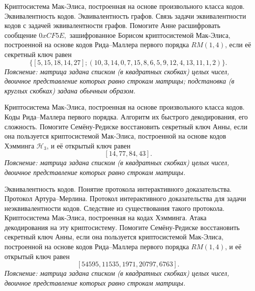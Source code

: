 \begin{questions}
    \question
        Криптосистема Мак-Элиса, построенная на основе произвольного класса кодов.
    \question
        Эквивалентность кодов.
        Эквивалентность графов.
        Связь задачи эквивалентности кодов с задачей эквивалентности графов.
    \question
        Помогите Анне расшифровать сообщение \(0xCF5E,\) зашифрованное Борисом криптосистемой Мак-Элиса, построенной на основе кодов Рида--Маллера первого порядка \(RM(1,4)\), если её секретный ключ равен \[\{[5, 15, 18, 14, 27]; (10, 3, 14, 0, 7, 15, 8, 6, 5, 9, 12, 4, 13, 11, 1, 2)\}.\]
        \emph{Пояснение: матрица задана списком (в квадратных скобках) целых чисел, двоичное представление которых равно строкам матрицы; подстановка (в круглых скобках) задана обычным образом.}
\end{questions}


\begin{questions}
    \question
        Криптосистема Мак-Элиса, построенная на основе произвольного класса кодов.
    \question
        Коды Рида--Маллера первого порядка.
        Алгоритм их быстрого декодирования, его сложность.
    \question
        Помогите Семёну-Редиске восстановить секретный ключ Анны, если она пользуется криптосистемой Мак-Элиса, построенной на основе кодов Хэмминга \(\mathcal{H}_3\), и её открытый ключ равен 
        \[[14, 77, 84, 43].\]
        \emph{Пояснение: матрица задана списком (в квадратных скобках) целых чисел, двоичное представление которых равно строкам матрицы.}
\end{questions}


\begin{questions}
    \question
        Эквивалентность кодов.
        Понятие протокола интерактивного доказательства.
        Протокол Артура--Мерлина.
        Протокол интерактивного доказательства для задачи неэквивалентности кодов.
        Следствие из существования такого протокола.
    \question
        Криптосистема Мак-Элиса, построенная на кодах Хэмминга.
        Атака декодирования на эту криптосистему.
    \question
        Помогите Семёну-Редиске восстановить секретный ключ Анны, если она пользуется криптосистемой Мак-Элиса, построенной на основе кодов Рида--Маллера первого порядка \(RM(1, 4)\), и её открытый ключ равен 
        \[[54595, 11535, 1971, 20797, 6763].\]
        \emph{Пояснение: матрица задана списком (в квадратных скобках) целых чисел, двоичное представление которых равно строкам матрицы.}
\end{questions}


